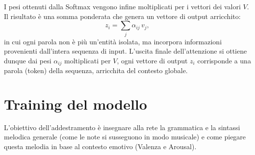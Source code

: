 I pesi ottenuti dalla Softmax vengono infine moltiplicati per i vettori dei valori $V$. Il risultato è una somma ponderata che genera un vettore di output arricchito:
\[
    z_i = \sum_j \alpha_{ij}\, v_j ,
\]
in cui ogni parola non è più un'entità isolata, ma incorpora informazioni provenienti dall'intera sequenza di input. L'uscita finale dell'attenzione si ottiene dunque dai pesi $\alpha_{ij}$ moltiplicati per $V$, ogni vettore di output $z_i$ corrisponde a una parola (token) della sequenza, arricchita del contesto globale.





\section{Training del modello}
L'obiettivo dell'addestramento è insegnare alla rete la grammatica e la sintassi melodica generale (come le note si susseguono in modo musicale) e come piegare questa melodia in base al contesto emotivo (Valenza e Arousal).

